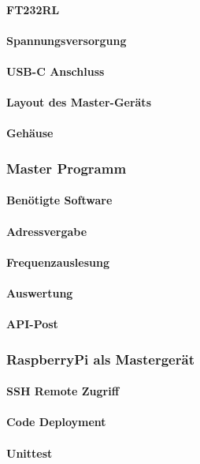 \paragraph{FT232RL}
\paragraph{Spannungsversorgung}
\paragraph{USB-C Anschluss}
\paragraph{Layout des Master-Geräts}
\paragraph{Gehäuse}

\subsubsection{Master Programm}
\paragraph{Benötigte Software}
\paragraph{Adressvergabe}
\paragraph{Frequenzauslesung}
\paragraph{Auswertung}
\paragraph{API-Post}

\subsubsection{RaspberryPi als Mastergerät}
\paragraph{SSH Remote Zugriff}
\paragraph{Code Deployment}
\paragraph{Unittest}


